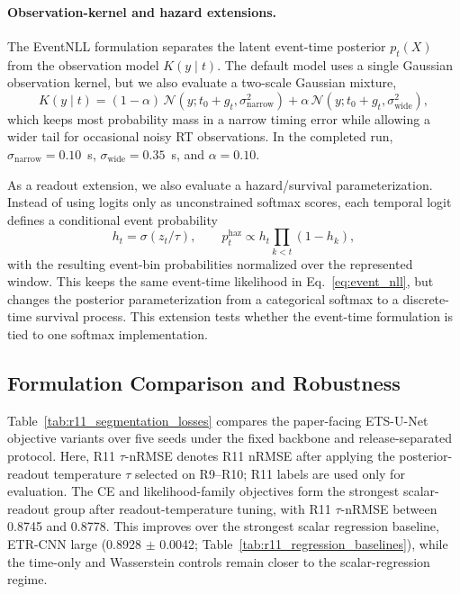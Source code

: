 \documentclass[12pt]{article}
\begin{document}
\paragraph{Observation-kernel and hazard extensions.}
The EventNLL formulation separates the latent event-time posterior $p_t(X)$ from the observation model $K(y\mid t)$. The default model uses a single Gaussian observation kernel, but we also evaluate a two-scale Gaussian mixture,
\begin{equation}
\label{eq:event_nll_mixture_kernel}
K(y\mid t)=(1-\alpha)\,\mathcal{N}(y;t_0+g_t,\sigma_{\mathrm{narrow}}^2)
+\alpha\,\mathcal{N}(y;t_0+g_t,\sigma_{\mathrm{wide}}^2),
\end{equation}
which keeps most probability mass in a narrow timing error while allowing a wider tail for occasional noisy RT observations. In the completed run, $\sigma_{\mathrm{narrow}}=0.10$~s, $\sigma_{\mathrm{wide}}=0.35$~s, and $\alpha=0.10$.

As a readout extension, we also evaluate a hazard/survival parameterization. Instead of using logits only as unconstrained softmax scores, each temporal logit defines a conditional event probability
\begin{equation}
\label{eq:hazard_readout}
h_t=\sigma(z_t/\tau),\qquad
p_t^{\mathrm{haz}} \propto h_t\prod_{k<t}(1-h_k),
\end{equation}
with the resulting event-bin probabilities normalized over the represented window. This keeps the same event-time likelihood in Eq.~\ref{eq:event_nll}, but changes the posterior parameterization from a categorical softmax to a discrete-time survival process. This extension tests whether the event-time formulation is tied to one softmax implementation.

\subsection{Formulation Comparison and Robustness}
Table~\ref{tab:r11_segmentation_losses} compares the paper-facing ETS-U-Net objective variants over five seeds under the fixed backbone and release-separated protocol. Here, R11 \(\tau\)-nRMSE denotes R11 nRMSE after applying the posterior-readout temperature \(\tau\) selected on R9--R10; R11 labels are used only for evaluation. The CE and likelihood-family objectives form the strongest scalar-readout group after readout-temperature tuning, with R11 \(\tau\)-nRMSE between 0.8745 and 0.8778. This improves over the strongest scalar regression baseline, ETR-CNN large (0.8928 $\pm$ 0.0042; Table~\ref{tab:r11_regression_baselines}), while the time-only and Wasserstein controls remain closer to the scalar-regression regime.
\end{document}
